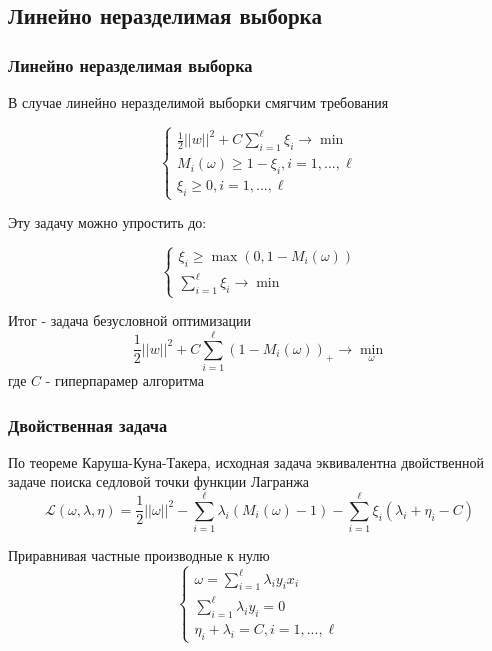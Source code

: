 \documentclass{beamer}
\begin{document}
	\subsection{Линейно неразделимая выборка}
	
	\begin{frame}
		\frametitle{Линейно неразделимая выборка}
		В случае линейно неразделимой выборки смягчим требования
		
		\[
		\begin{cases}
			\frac{1}{2}||w||^2 + C \sum_{i=1}^{\ell} \xi_i \rightarrow \min \\
			M_i(\omega) \ge 1 - \xi_i,  i=1, ..., \ell \\
			\xi_i \ge 0, i=1, ..., \ell
		\end{cases}
		\]
		
		Эту задачу можно упростить до:
		
		\[
		\begin{cases}
			\xi_i \ge \max(0, 1 - M_i(\omega)) \\
			\sum_{i=1}^{\ell} \xi_i \rightarrow \min
			
		\end{cases}
		\]
		
		Итог - задача безусловной оптимизации
		\[
		\frac{1}{2}||w||^2 + C \sum_{i=1}^{\ell} (1 - M_i(\omega))_{+} \rightarrow \min_{\omega}
		\]
		где $C$ - гиперпарамер алгоритма
	\end{frame}
	
	\begin{frame}
		\frametitle{Двойственная задача}
		По теореме Каруша-Куна-Такера, исходная задача эквивалентна двойственной задаче поиска седловой точки функции Лагранжа
		\[
		\mathcal{L}(\omega, \lambda, \eta) = 
		\frac{1}{2} ||\omega||^2 
		- \sum_{i=1}^{\ell} \lambda_i (M_i(\omega) - 1)
		- \sum_{i=1}^{\ell} \xi_i (\lambda_i + \eta_i - C)
		\]
		
		Приравнивая частные производные к нулю
		\[
		\begin{cases}
			\omega = \sum_{i=1}^{\ell} \lambda_i y_i x_i \\
			\sum_{i=1}^{\ell} \lambda_i y_i = 0 \\
			\eta_i + \lambda_i = C, i=1, ..., \ell
		\end{cases}
		\]
	\end{frame}
	
\end{document}
